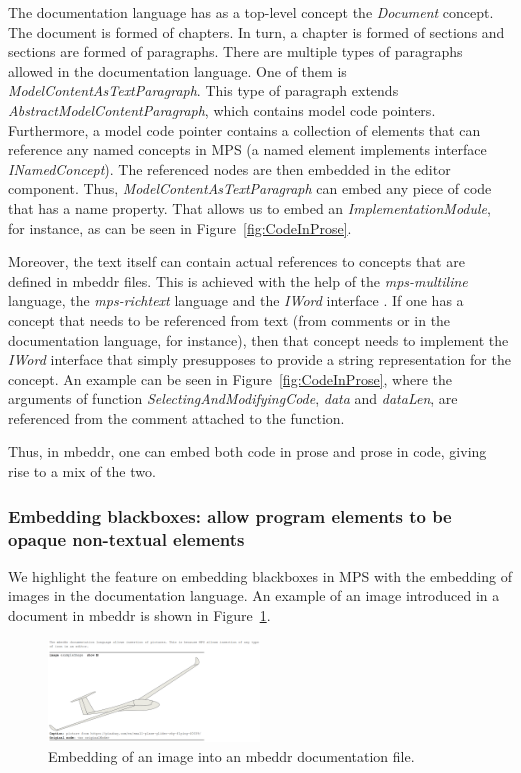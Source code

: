 \documentclass[preprint,numbers,10pt]{sigplanconf}
\begin{document}
The documentation language has as a top-level concept the \emph{Document} concept. The document is formed of chapters. In turn, a chapter
is formed of sections and sections are formed of paragraphs. There are multiple types of paragraphs allowed in
the documentation language. One of them is \emph{ModelContentAsTextParagraph}. This type of paragraph
extends \emph{AbstractModelContentParagraph}, which contains model code pointers. Furthermore, a model code pointer contains
a collection of elements that can reference any named concepts in MPS (a named element implements interface
\emph{INamedConcept}). The referenced nodes are then embedded in the editor component.
Thus, \emph{ModelContentAsTextParagraph} can embed any piece of code that has a name property.
That allows us to embed an \emph{ImplementationModule}, for instance, as can be seen in Figure~\ref{fig:CodeInProse}.

Moreover, the text itself can contain actual references to concepts that are defined in mbeddr files.
This is achieved with the help of the \emph{mps-multiline} language, the \emph{mps-richtext} language
and the \emph{IWord} interface \cite{voelter2013integrating}.
If one has a concept that needs to be referenced from text (from comments or in the documentation language, for instance), then
that concept needs to implement the \emph{IWord} interface that simply presupposes to provide a string representation
for the concept. An example can be seen in Figure~\ref{fig:CodeInProse}, where the arguments of function
\emph{SelectingAndModifyingCode}, \emph{data} and \emph{dataLen}, are referenced from the comment attached
to the function.

Thus, in mbeddr, one can embed both code in prose and prose in code, giving rise to a mix of the two.
\subsubsection{Embedding blackboxes: allow program elements to be opaque non-textual elements}
We highlight the feature on embedding blackboxes in MPS with the embedding of images
in the documentation language. An example of an image introduced in a document in mbeddr is shown in Figure~\ref{fig:ImageInDoc}.

\begin{figure}[H]
	\centering
	\includegraphics[width=0.50\textwidth]{screens/PlaneGlider.png}
	\caption{Embedding of an image into an mbeddr documentation file.}
	\label{fig:ImageInDoc}
\end{figure}
\end{document}
